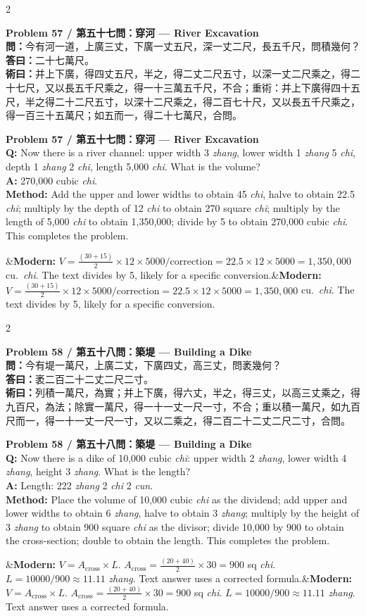 \documentclass[11pt,a4paper]{article}
\newcommand{\bilingualproblem}[4]{%
  \begin{paracol}{2}
  \begin{leftcolumn}
  \noindent\textbf{\color{problemcolor}#1}\\[0.2cm]
  #2
  \end{leftcolumn}
  \switchcolumn
  \noindent\textbf{\color{problemcolor}#1}\\[0.2cm]
  #3
  \end{paracol}
  \ifx&#4&\else\vspace{0.3cm}\noindent#4\fi
  \vspace{0.5cm}
}
\newcommand{\wen}[1]{\textcolor{problemcolor}{\textbf{問：}}#1}
\newcommand{\da}[1]{\textcolor{answercolor}{\textbf{答曰：}}#1}
\newcommand{\shu}[1]{\textcolor{methodcolor}{\textbf{術曰：}}#1}
\newcommand{\wenen}[1]{\textcolor{problemcolor}{\textbf{Q:}} #1}
\newcommand{\daen}[1]{\textcolor{answercolor}{\textbf{A:}} #1}
\newcommand{\shuen}[1]{\textcolor{methodcolor}{\textbf{Method:}} #1}
\begin{document}
\bilingualproblem{Problem 57 / 第五十七問：穿河 --- River Excavation}{
\wen{今有河一道，上廣三丈，下廣一丈五尺，深一丈二尺，長五千尺，問積幾何？}\\[0.2cm]
\da{二十七萬尺。}\\[0.2cm]
\shu{并上下廣，得四丈五尺，半之，得二丈二尺五寸，以深一丈二尺乘之，得二十七尺，又以長五千尺乘之，得一十三萬五千尺，不合；重術：并上下廣得四十五尺，半之得二十二尺五寸，以深十二尺乘之，得二百七十尺，又以長五千尺乘之，得一百三十五萬尺；如五而一，得二十七萬尺，合問。}
}{
\wenen{Now there is a river channel: upper width 3 \textit{zhang}, lower width 1 \textit{zhang} 5 \textit{chi}, depth 1 \textit{zhang} 2 \textit{chi}, length 5,000 \textit{chi}. What is the volume?}\\[0.2cm]
\daen{270,000 cubic \textit{chi}.}\\[0.2cm]
\shuen{Add the upper and lower widths to obtain 45 \textit{chi}, halve to obtain 22.5 \textit{chi}; multiply by the depth of 12 \textit{chi} to obtain 270 square \textit{chi}; multiply by the length of 5,000 \textit{chi} to obtain 1,350,000; divide by 5 to obtain 270,000 cubic \textit{chi}. This completes the problem.}
}{\textbf{Modern:} $V = \frac{(30+15)}{2} \times 12 \times 5000 / \text{correction} = 22.5 \times 12 \times 5000 = 1,350,000$ cu.\ \textit{chi}. The text divides by 5, likely for a specific conversion.}

\bilingualproblem{Problem 58 / 第五十八問：築堤 --- Building a Dike}{
\wen{今有堤一萬尺，上廣二丈，下廣四丈，高三丈，問袤幾何？}\\[0.2cm]
\da{袤二百二十二丈二尺二寸。}\\[0.2cm]
\shu{列積一萬尺，為實；并上下廣，得六丈，半之，得三丈，以高三丈乘之，得九百尺，為法；除實一萬尺，得一十一丈一尺一寸，不合；重以積一萬尺，如九百尺而一，得一十一丈一尺一寸，又以二乘之，得二百二十二丈二尺二寸，合問。}
}{
\wenen{Now there is a dike of 10,000 cubic \textit{chi}: upper width 2 \textit{zhang}, lower width 4 \textit{zhang}, height 3 \textit{zhang}. What is the length?}\\[0.2cm]
\daen{Length: 222 \textit{zhang} 2 \textit{chi} 2 \textit{cun}.}\\[0.2cm]
\shuen{Place the volume of 10,000 cubic \textit{chi} as the dividend; add upper and lower widths to obtain 6 \textit{zhang}, halve to obtain 3 \textit{zhang}; multiply by the height of 3 \textit{zhang} to obtain 900 square \textit{chi} as the divisor; divide 10,000 by 900 to obtain the cross-section; double to obtain the length. This completes the problem.}
}{\textbf{Modern:} $V = A_{\text{cross}} \times L$. $A_{\text{cross}} = \frac{(20+40)}{2} \times 30 = 900$ sq \textit{chi}. $L = 10000 / 900 \approx 11.11$ \textit{zhang}. Text answer uses a corrected formula.}
\end{document}
